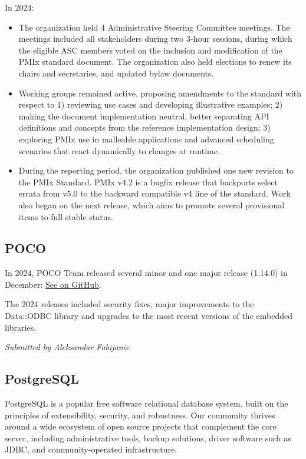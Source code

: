 \documentclass[a4paper]{report}
\begin{document}
In 2024:

\begin{itemize}

\item The organization held 4 Administrative Steering Committee meetings. The meetings included all stakeholders during two 3-hour sessions, during which the eligible ASC members voted on the inclusion and modification of the PMIx standard document. The organization also held elections to renew its chairs and secretaries, and updated bylaw documents.

\item Working groups remained active, proposing amendments to the standard with respect to 1) reviewing use cases and developing illustrative examples; 2) making the document implementation neutral, better separating API definitions and concepts from the reference implementation design; 3) exploring PMIx use in malleable applications and advanced scheduling scenarios that react dynamically to changes at runtime.

\item During the reporting period, the organization published one new revision to the PMIx Standard. PMIx v4.2 is a bugfix release that backports select errata from v5.0 to the backward compatible v4 line of the standard. Work also began on the next release, which aims to promote several provisional items to full stable status.

\end{itemize}

\subsection{POCO}

In 2024, POCO Team released several minor and one major release (1.14.0) in December: \href{https://github.com/pocoproject/poco/releases/tag/poco-1.14.0-release}{See on GitHub}.

The 2024 releases included security fixes, major improvements to the Data::ODBC library and upgrades to the most recent versions of the embedded libraries.

{\em Submitted by Aleksandar Fabijanic}

\subsection{PostgreSQL}

PostgreSQL is a popular free software relational database system, built on the principles of extensibility, security, and robustness. Our community thrives around a wide ecosystem of open source projects that complement the core server, including administrative tools, backup solutions, driver software such as JDBC, and community-operated infrastructure.
\end{document}
